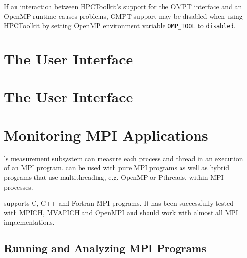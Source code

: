 \documentclass[11pt,letterpaper]{report}
\begin{document}
If an interaction between HPCToolkit's support for the OMPT interface and an OpenMP runtime causes problems, OMPT support may be disabled when using HPCToolkit by setting  OpenMP environment variable {\tt OMP\_TOOL} to {\tt disabled}.





\chapter{The \hpcviewer{} User Interface}
\label{chpt:hpcviewer-interface}





\chapter{The \hpctraceviewer{} User Interface}
\label{chpt:hpctraceviewer-interface}





\chapter{Monitoring MPI Applications}
\label{chpt:mpi-apps}

\HPCToolkit{}'s measurement subsystem can measure each process and thread in an execution of an MPI program.
\HPCToolkit{} can be used with pure MPI programs as well as hybrid programs that use multithreading, e.g. OpenMP or Pthreads, within MPI processes.

\HPCToolkit{} supports C, C++ and Fortran MPI programs.
It has been successfully tested with MPICH, MVAPICH and OpenMPI and should work with almost all MPI implementations.



\section{Running and Analyzing MPI Programs}
\end{document}
